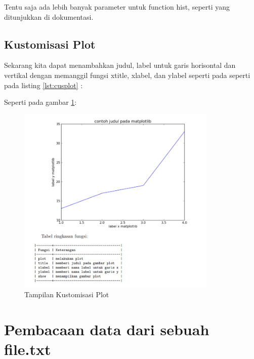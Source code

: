 Tentu saja ada lebih banyak parameter untuk function hist, seperti yang ditunjukkan di dokumentasi.

\subsection{Kustomisasi Plot} 
Sekarang kita dapat menambahkan judul, label untuk garis horisontal dan vertikal dengan memanggil fungsi xtitle, xlabel, dan ylabel seperti pada seperti pada listing \ref{lst:cusplot} : 

Seperti pada gambar \ref{fig:cusplot}:
\begin{figure}[!htbp]
	\centerline{\includegraphics[width=0.85\textwidth]{figures/6/cusplot.PNG}}
	\caption{Tampilan Kustomisasi Plot}
	\label{fig:cusplot}
\end{figure}

\section{Pembacaan data dari sebuah file.txt} 
